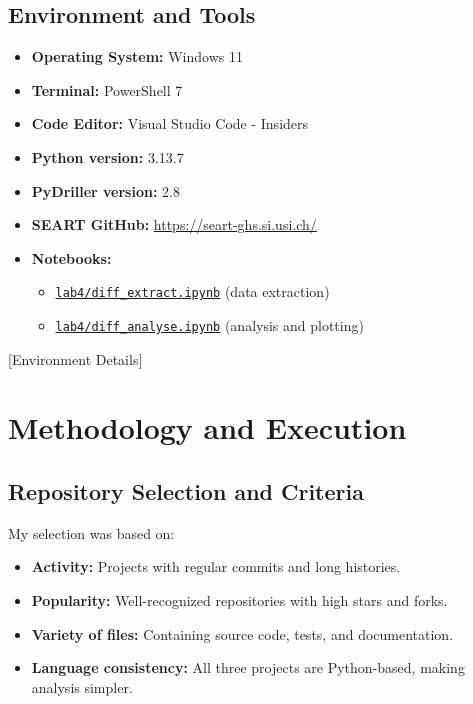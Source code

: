 \documentclass[10pt,a4paper]{report}
\begin{document}
\subsection{Environment and Tools}
\begin{itemize}[itemsep=0em, topsep=0pt]
    \item \textbf{Operating System:} Windows 11  
    \item \textbf{Terminal:} PowerShell 7  
    \item \textbf{Code Editor:} Visual Studio Code - Insiders
    \item \textbf{Python version:} 3.13.7  
    \item \textbf{PyDriller version:} 2.8
    \item \textbf{SEART GitHub:} \url{https://seart-ghs.si.usi.ch/}
    \item \textbf{Notebooks:}  
    \begin{itemize}[itemsep=0em, topsep=0pt]
        \item \href{https://github.com/ShardulJunagade/cs202-stt/blob/main/lab4/diff_extract.ipynb}{\texttt{lab4/diff\_extract.ipynb}} (data extraction)  
        \item \href{https://github.com/ShardulJunagade/cs202-stt/blob/main/lab4/diff_analyse.ipynb}{\texttt{lab4/diff\_analyse.ipynb}} (analysis and plotting)  
    \end{itemize}
\end{itemize}

[Environment Details]

\section{Methodology and Execution}

\subsection{Repository Selection and Criteria}

My selection was based on:
\begin{itemize}[itemsep=0em, topsep=0pt]
    \item \textbf{Activity:} Projects with regular commits and long histories.  
    \item \textbf{Popularity:} Well-recognized repositories with high stars and forks.  
    \item \textbf{Variety of files:} Containing source code, tests, and documentation.  
    \item \textbf{Language consistency:} All three projects are Python-based, making analysis simpler.  
\end{itemize}
\end{document}
